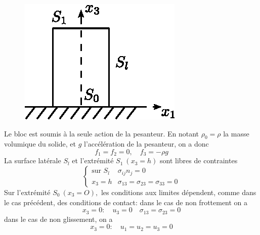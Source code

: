 \begin{figure}
\begin{center}
    \includegraphics{../images/T1_Ch04-0004}
\end{center}
\end{figure}
Le bloc est soumis à la seule action de la pesanteur.
En notant $\rho_0 = \rho$ la masse volumique du solide, et $g$ l'accélération de la pesanteur, on a donc
\begin{equation}
    f_1 = f_2 = 0, \quad f_3 = -\rho g
    \label{eq:Ch04-017}
\end{equation}
La surface latérale $S_l$ et l'extrémité $S_1\ (x_3=h)$ sont libres de contraintes
\begin{equation}
    \left\{
    \begin{aligned}
        \text{sur } S_l & \sigma_{ij} n_j = 0 \\
        x_3 = h & \sigma_{13} = \sigma_{23} = \sigma_{33} = 0
    \end{aligned}
    \right.
    \label{eq:Ch04-018}
\end{equation}
Sur l'extrémité $S_0\ (x_3=O),$ les conditions aux limites dépendent, comme dans le cas précédent, des conditions de contact: dans le cas de non frottement on a
\begin{equation}
    x_3 = 0: \quad u_3 = 0 \quad \sigma_{13} = \sigma_{23} = 0
    \label{eq:Ch04-019}
\end{equation}
dans le cas de non glissement, on a 
\begin{equation}
    x_3 = 0: \quad u_1 = u_2 = u_3 = 0
    \label{eq:Ch04-020}
\end{equation}

